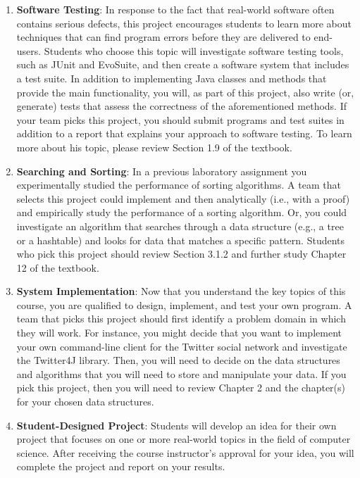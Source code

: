 \begin{enumerate}
  \item {\bf Software Testing}: In response to the fact that real-world software often contains serious defects, this
    project encourages students to learn more about techniques that can find program errors before they are delivered to
    end-users. Students who choose this topic will investigate software testing tools, such as JUnit and EvoSuite, and
    then create a software system that includes a test suite. In addition to implementing Java classes and methods that
    provide the main functionality, you will, as part of this project, also write (or, generate) tests that assess the
    correctness of the aforementioned methods. If your team picks this project, you should submit programs and test
    suites in addition to a report that explains your approach to software testing. To learn more about his topic,
    please review Section 1.9 of the textbook.

  \item {\bf Searching and Sorting}: In a previous laboratory assignment you experimentally studied the performance of
    sorting algorithms. A team that selects this project could implement and then analytically (i.e., with a proof) and
    empirically study the performance of a sorting algorithm. Or, you could investigate an algorithm that searches
    through a data structure (e.g., a tree or a hashtable) and looks for data that matches a specific pattern. Students
    who pick this project should review Section 3.1.2 and further study Chapter 12 of the textbook.

  \item {\bf System Implementation}: Now that you understand the key topics of this course, you are qualified to design,
    implement, and test your own program. A team that picks this project should first identify a problem domain in which
    they will work. For instance, you might decide that you want to implement your own command-line client for the
    Twitter social network and investigate the Twitter4J library. Then, you will need to decide on the data structures
    and algorithms that you will need to store and manipulate your data. If you pick this project, then you will need to
    review Chapter 2 and the chapter(s) for your chosen data structures.

  \item {\bf Student-Designed Project}: Students will develop an idea for their own project that focuses on one or more
    real-world topics in the field of computer science. After receiving the course instructor's approval for your idea,
    you will complete the project and report on your results.

\end{enumerate}

